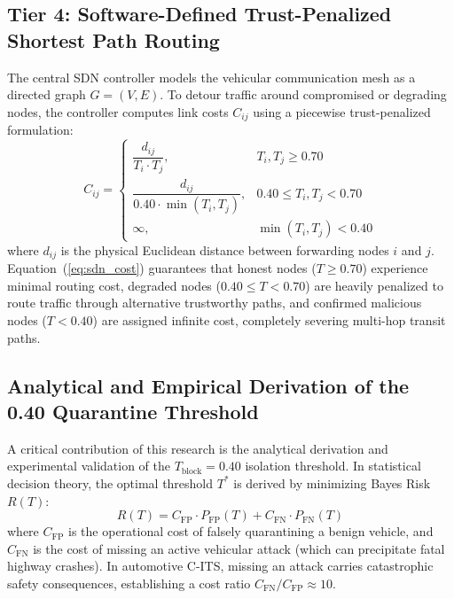 \documentclass[conference]{IEEEtran}
\begin{document}
\subsection{Tier 4: Software-Defined Trust-Penalized Shortest Path Routing}

The central SDN controller models the vehicular communication mesh as a directed graph $G = (V, E)$. To detour traffic around compromised or degrading nodes, the controller computes link costs $C_{ij}$ using a piecewise trust-penalized formulation:
\begin{equation}
C_{ij} = \begin{cases} 
\dfrac{d_{ij}}{T_i \cdot T_j}, & T_i, T_j \ge 0.70 \\[7pt] 
\dfrac{d_{ij}}{0.40 \cdot \min(T_i, T_j)}, & 0.40 \le T_i, T_j < 0.70 \\[7pt] 
\infty, & \min(T_i, T_j) < 0.40 
\end{cases}
\label{eq:sdn_cost}
\end{equation}
where $d_{ij}$ is the physical Euclidean distance between forwarding nodes $i$ and $j$. Equation~(\ref{eq:sdn_cost}) guarantees that honest nodes ($T \ge 0.70$) experience minimal routing cost, degraded nodes ($0.40 \le T < 0.70$) are heavily penalized to route traffic through alternative trustworthy paths, and confirmed malicious nodes ($T < 0.40$) are assigned infinite cost, completely severing multi-hop transit paths.

\subsection{Analytical and Empirical Derivation of the 0.40 Quarantine Threshold}

A critical contribution of this research is the analytical derivation and experimental validation of the $T_{\text{block}} = 0.40$ isolation threshold. In statistical decision theory, the optimal threshold $T^*$ is derived by minimizing Bayes Risk $R(T)$:
\begin{equation}
R(T) = C_{\text{FP}} \cdot P_{\text{FP}}(T) + C_{\text{FN}} \cdot P_{\text{FN}}(T)
\label{eq:bayes_risk}
\end{equation}
where $C_{\text{FP}}$ is the operational cost of falsely quarantining a benign vehicle, and $C_{\text{FN}}$ is the cost of missing an active vehicular attack (which can precipitate fatal highway crashes). In automotive C-ITS, missing an attack carries catastrophic safety consequences, establishing a cost ratio $C_{\text{FN}} / C_{\text{FP}} \approx 10$.
\end{document}
